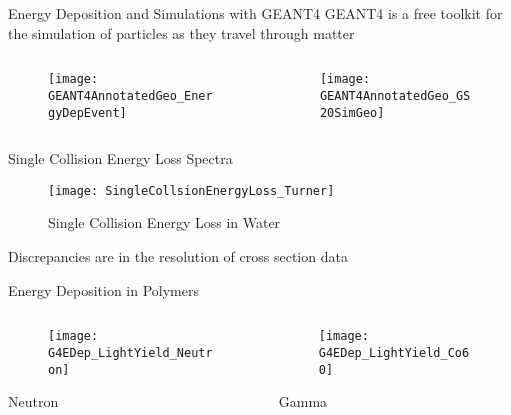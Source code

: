 \begin{frame}{Energy Deposition and Simulations with GEANT4}
GEANT4 is a free toolkit for the simulation of particles as they travel through matter\cite{agostinelli_geant4simulation_2003}
\label{G4Main}
  \begin{columns}[onlytextwidth]
  \begin{column}{0.49\textwidth}
    \centering
    \begin{figure}
    \texttt{[image: GEANT4AnnotatedGeo\_EnergyDepEvent]}
    \end{figure}
  \end{column}
  \begin{column}{0.49\textwidth}
    \centering
    \begin{figure}
	  \texttt{[image: GEANT4AnnotatedGeo\_GS20SimGeo]}
    \end{figure}
  \end{column}
  \end{columns}
\hyperlink{G4Intro}{}
\end{frame}
\begin{frame}{Single Collision Energy Loss Spectra}
  \begin{figure}
    \texttt{[image: SingleCollsionEnergyLoss\_Turner]}
    \caption{Single Collision Energy Loss in Water\cite{turner_comparative_1982}}
  \end{figure}
\vspace{2mm}
Discrepancies are in the resolution of cross section data
\end{frame}
\begin{frame}{Energy Deposition in Polymers}
  \begin{columns}[onlytextwidth]
  \begin{column}{0.5\textwidth}
    \centering
    \begin{figure}
    	\texttt{[image: G4EDep\_LightYield\_Neutron]}
    \end{figure}
      Neutron
  \end{column}
  \begin{column}{0.5\textwidth}
    \centering
    \begin{figure}
    	\texttt{[image: G4EDep\_LightYield\_Co60]}
    \end{figure}
       Gamma
  \end{column}
  \end{columns}
\end{frame}
